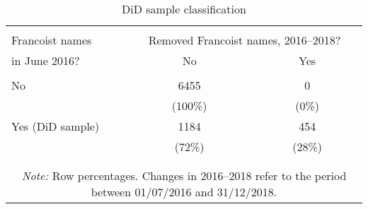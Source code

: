 \begin{table}[!htbp] \centering
\caption{DiD sample classification}
\label{tab:sample_trt}
\small
\begin{tabular}{lcc}
\\[-1.8ex]\hline
\hline \\[-1.8ex]
\multicolumn{1}{p{3cm}}{\hspace{3cm} Francoist names} & \multicolumn{2}{p{3.5cm}}{Removed Francoist names, 2016--2018?}\\
in June 2016? & No & Yes \\
\cline{2-3} \\[-1.8ex]
No & 6455 & 0 \\
 & (100\%) & (0\%) \\
Yes (DiD sample) \hspace{2cm} & 1184 & 454 \\
 & (72\%) & (28\%) \\
\\[-1.8ex]\hline
\hline \\[-1.8ex]
\multicolumn{3}{c}{\parbox[t]{0.55\textwidth}{\textit{Note:} Row percentages. Changes in 2016--2018 refer to the period between 01/07/2016 and 31/12/2018.}}\\
\end{tabular}
\end{table}
